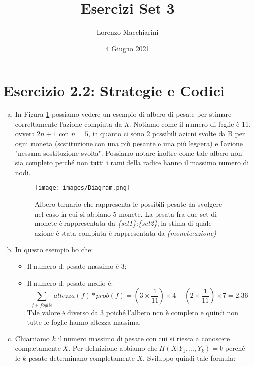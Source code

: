 \documentclass{article}
\title{Esercizi Set 3}
\author{Lorenzo Macchiarini}
\date{4 Giugno 2021}
\begin{document}
\maketitle

\section{Esercizio 2.2: Strategie e Codici}

\begin{enumerate}[(a)]
    \item In Figura \ref{fig:Tree} possiamo vedere un esempio di albero di pesate per stimare correttamente l'azione compiuta da A. Notiamo come il numero di foglie è 11, ovvero $2n+1$ con $n=5$, in quanto ci sono 2 possibili azioni svolte da B per ogni moneta (sostituzione con una più pesante o una più leggera) e l'azione "nessuna sostituzione svolta". Possiamo notare inoltre come tale albero non sia completo perché non tutti i rami della radice hanno il massimo numero di nodi.
    \begin{figure}[h]
    \centering
    \texttt{[image: images/Diagram.png]}
    \caption{Albero ternario che rappresenta le possibili pesate da svolgere nel caso in cui si abbiano 5 monete. La pesata fra due set di monete è rappresentata da \textit{\{set1\};\{set2\}}, la stima di quale azione è stata compiuta è rappresentata da \textit{(moneta;azione)}}
    \label{fig:Tree}
    \end{figure}
    \item In questo esempio ho che:
    \begin{itemize}
        \item Il numero di pesate massimo è 3;
        \item Il numero di pesate medio è: 
        \begin{equation}
            \sum_{f \in foglie}altezza(f)*prob(f)=\left(3 \times \frac{1}{11} \right) \times 4 + \left(2 \times \frac{1}{11} \right) \times 7 = 2.36
        \end{equation}
        Tale valore è diverso da 3 poiché l'albero non è completo e quindi non tutte le foglie hanno altezza massima.
    \end{itemize}
    \item Chiamiamo $k$ il numero massimo di pesate con cui si riesca a conoscere completamente $X$. Per definizione abbiamo che $H(X|Y_1, ... , Y_k) = 0$ perché le $k$ pesate determinano completamente $X$. Sviluppo quindi tale formula:
    \begin{equation}

\end{equation}
\end{enumerate}
\end{document}
